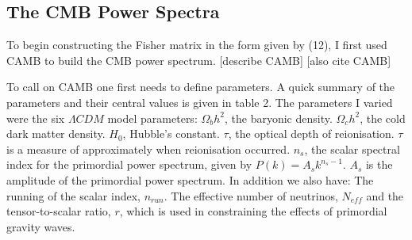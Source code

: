 \subsection{The CMB Power Spectra}

To begin constructing the Fisher matrix in the form given by (12), I first used CAMB to build the CMB power spectrum. [describe CAMB] [also cite CAMB]

To call on CAMB one first needs to define parameters. A quick summary of the parameters and their central values is given in table 2. The parameters I varied were the six $\Lambda CDM$ model parameters: $\Omega_{b}h^{2}$, the baryonic density. $\Omega_{c}h^{2}$, the cold dark matter density. $H_0$, Hubble's constant. $\tau$, the optical depth of reionisation. $\tau$ is a measure of approximately when reionisation occurred. $n_s$, the scalar spectral index for the primordial power spectrum, given by $P(k) = A_s k^{n_s - 1}$. $A_s$ is the amplitude of the primordial power spectrum. In addition we also have: The running of the scalar index, $n_{run}$. The effective number of neutrinos, $N_{eff}$ and the tensor-to-scalar ratio, $r$, which is used in constraining the effects of primordial gravity waves.

